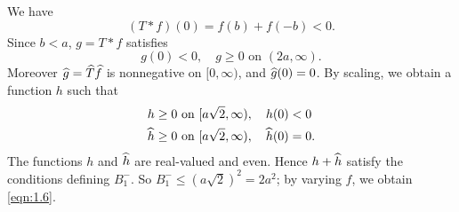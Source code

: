 We have
\[
    (T \ast f)(0) = f(b) + f(-b) < 0.
\]
Since $b < a$, $g = T \ast f$ satisfies
\[
    g(0) < 0, \quad g \geq 0 \text{ on }(2a, \infty).
\]
Moreover $\widehat{g} = \widehat{T}\widehat{f}$ is nonnegative on $[0, \infty)$, and $\widehat{g}(0) = 0$.
By scaling, we obtain a function $h$ such that
\begin{align*}
    h &\geq 0 \text{ on } [a \sqrt{2}, \infty),\quad h(0) < 0 \\
    \widehat{h} &\geq 0 \text{ on } [a \sqrt{2}, \infty),\quad \widehat{h}(0) = 0. \\
\end{align*}
The functions $h$ and $\widehat{h}$ are real-valued and even.
Hence $h + \widehat{h}$ satisfy the conditions defining $B_{1}^{-}$.
So $B_{1}^{-} \leq (a \sqrt{2})^{2} = 2a^{2}$; by varying $f$, we obtain \eqref{eqn:1.6}.
